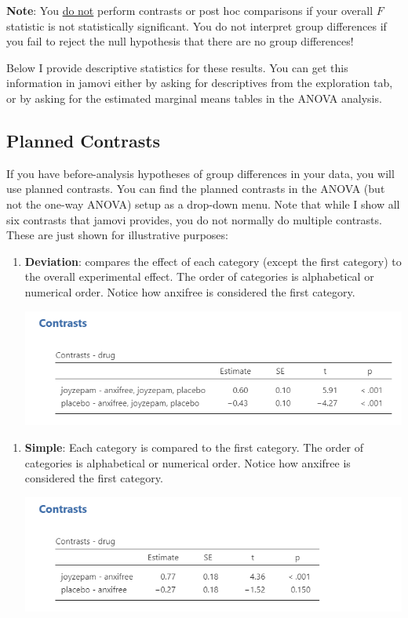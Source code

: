\documentclass[
]{book}
\begin{document}
\textbf{Note}: You \underline{do not} perform contrasts or post hoc comparisons if your overall \(F\) statistic is not statistically significant. You do not interpret group differences if you fail to reject the null hypothesis that there are no group differences!

Below I provide descriptive statistics for these results. You can get this information in jamovi either by asking for descriptives from the exploration tab, or by asking for the estimated marginal means tables in the ANOVA analysis.

\hypertarget{planned-contrasts}{%
\subsection{Planned Contrasts}\label{planned-contrasts}}

If you have before-analysis hypotheses of group differences in your data, you will use planned contrasts. You can find the planned contrasts in the ANOVA (but not the one-way ANOVA) setup as a drop-down menu. Note that while I show all six contrasts that jamovi provides, you do not normally do multiple contrasts. These are just shown for illustrative purposes:

\begin{enumerate}
\def\labelenumi{\arabic{enumi}.}
\item
  \textbf{Deviation}: compares the effect of each category (except the first category) to the overall experimental effect. The order of categories is alphabetical or numerical order. Notice how anxifree is considered the first category.

  \includegraphics{images/04_one-way-anova/contrasts_deviation.png}
\end{enumerate}

\begin{enumerate}
\def\labelenumi{\arabic{enumi}.}
\setcounter{enumi}{1}
\item
  \textbf{Simple}: Each category is compared to the first category. The order of categories is alphabetical or numerical order. Notice how anxifree is considered the first category.

  \includegraphics{images/04_one-way-anova/contrasts_simple.png}
\end{enumerate}
\end{document}
